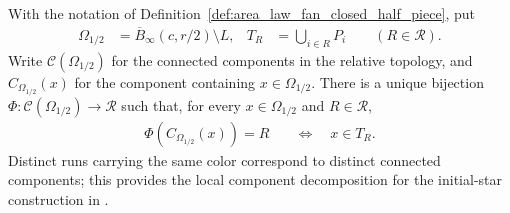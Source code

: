 \begin{lemma}
    \label{thm:area_law_closed_half_fan_components}
    \leanok
    With the notation of Definition~\ref{def:area_law_fan_closed_half_piece},
    put
    \begin{align}
        \Omega_{1/2} & =\overline B_\infty(c,r/2)\setminus L,
                     & T_R                                    & =\bigcup_{i\in R}P_i \qquad (R\in\mathcal R).
    \end{align}
    Write $\mathcal C(\Omega_{1/2})$ for the connected components in
    the relative topology, and $C_{\Omega_{1/2}}(x)$ for the component
    containing $x\in\Omega_{1/2}$.
    There is a unique bijection
    $\Phi:\mathcal C(\Omega_{1/2})\longrightarrow\mathcal R$ such that,
    for every $x\in\Omega_{1/2}$ and $R\in\mathcal R$,
    \begin{align}
        \Phi(C_{\Omega_{1/2}}(x))=R
         & \quad\Longleftrightarrow\quad x\in T_R.
        \label{eq:area_law_closed_half_fan_component_membership}
    \end{align}
    Distinct runs carrying the same color correspond to distinct
    connected components; this provides the local component decomposition
    for the initial-star construction in \cite[Section~11]{OpenAI2026AreaLaw}.
\end{lemma}
